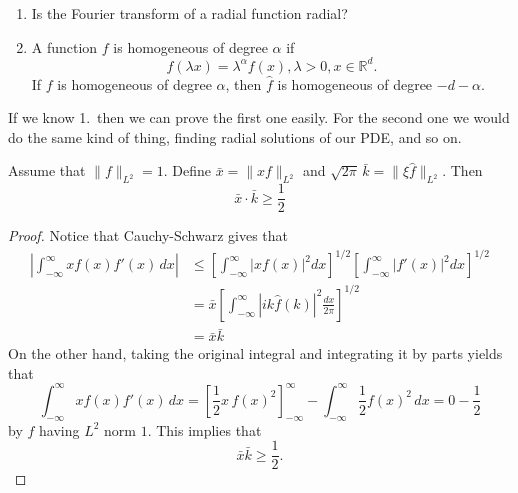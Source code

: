 \begin{proposition}[Exercises]\leavevmode
	\begin{enumerate}
	
		\item Is the Fourier transform of a radial function radial?
		\item A function \( f \) is homogeneous of degree \( \alpha \) if
			\[ f(\lambda x) = \lambda^{\alpha} f(x), \lambda > 0, x \in \mathbb{R}^{d}. \]
			If \( f \) is homogeneous of degree \( \alpha \), then \( \hat f \) is homogeneous of degree \( -d - \alpha \).
	
	\end{enumerate}
\end{proposition}

\begin{remark}
	If we know 1.\ then we can prove the first one easily. For the second one we would do the same kind of thing, finding radial solutions of our PDE, and so on.
\end{remark}

\begin{theorem}
	Assume that \( \| f\|_{L^{2}} = 1 \). Define \( \bar x = \| x f \|_{L^{2}} \) and \( \sqrt{2 \pi} \, \bar k = \| \xi \hat f \|_{L^{2}} \). Then
	\[ \bar x \cdot \bar k \ge \frac{1}{2} \]
\end{theorem}

\begin{proof}
	Notice that Cauchy-Schwarz gives that
	\begin{align*}
		\left| \int_{- \infty}^{\infty} x f(x) f'(x) \, dx \right| &\le \left[ \int_{- \infty}^{\infty} |x f(x)|^{2} dx \right]^{1/2} \left[ \int_{- \infty}^{\infty} |f'(x)|^{2} dx  \right]^{1/2} \\
																															 &= \bar x \left[ \int_{- \infty}^{\infty} |i k \hat f(k)|^{2} \frac{dx}{2 \pi} \right]^{1/2} \\
																															 &= \bar x \bar k
	\end{align*}
	On the other hand, taking the original integral and integrating it by parts yields that
	\[ \int_{- \infty}^{\infty} x f(x) f'(x) \, dx = \left[ \frac{1}{2}x \, f(x)^{2} \right]_{- \infty}^{\infty} - \int_{- \infty}^{\infty}  \frac{1}{2} f(x)^{2} \, dx = 0 - \frac{1}{2} \]
	by \( f \) having \( L^{2} \) norm \( 1 \). This implies that
	\[ \bar x \bar k \ge \frac{1}{2}. \]
\end{proof}



